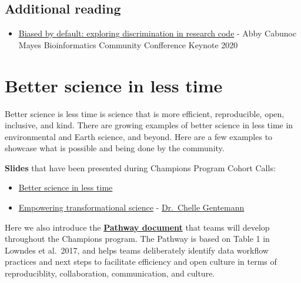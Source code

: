 \documentclass[
  letterpaper,
  DIV=11,
  numbers=noendperiod]{scrreprt}
\providecommand{\tightlist}{%
  \setlength{\itemsep}{0pt}\setlength{\parskip}{0pt}}
\begin{document}
\hypertarget{additional-reading-1}{%
\section{Additional reading}\label{additional-reading-1}}

\begin{itemize}
\tightlist
\item
  \href{https://docs.google.com/presentation/d/1INTsli9obj3BiV8xDwJc4IovPnt2EUFNyLYyF_GK7bE/present\#slide=id.g8dabbda190_0_898}{Biased
  by default: exploring discrimination in research code} - Abby Cabunoc
  Mayes Bioinformatics Community Confference Keynote 2020
\end{itemize}

\hypertarget{bsilt}{%
\chapter{Better science in less time}\label{bsilt}}

Better science is less time is science that is more efficient,
reproducible, open, inclusive, and kind. There are growing examples of
better science in less time in environmental and Earth science, and
beyond. Here are a few examples to showcase what is possible and being
done by the community.

\textbf{Slides} that have been presented during Champions Program Cohort
Calls:

\begin{itemize}
\tightlist
\item
  \href{https://docs.google.com/presentation/d/1GmuTa1sUO_boH-2TonC875pD5xvXaIMHRKIoO3vUrdY/edit?usp=sharing}{Better
  science in less time}
\item
  \href{https://docs.google.com/presentation/d/1SUMiQg0HhD19H-D6DDzTrFQVzub0kOINwJBG59uQCTw/edit\#slide=id.p1}{Empowering
  transformational science} -
  \href{https://twitter.com/ChelleGentemann}{Dr.~Chelle Gentemann}
\end{itemize}

Here we also introduce the
\href{https://drive.google.com/open?id=1X_-qPdWDCpw2F3nZr6vZnq87guyUIGLvekm0XV2H-A8}{\textbf{Pathway
document}} that teams will develop throughout the Champions program. The
Pathway is based on Table 1 in Lowndes et al.~2017, and helps teams
deliberately identify data workflow practices and next steps to
facilitate efficiency and open culture in terms of reproduciblity,
collaboration, communication, and culture.
\end{document}

